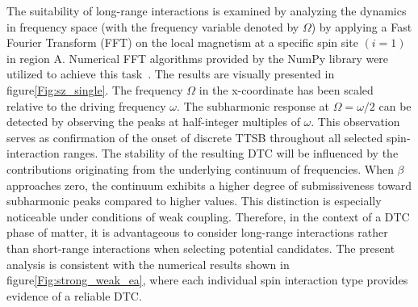 \documentclass[12pt]{iopart}
\begin{document}
The suitability of long-range interactions is examined by analyzing the dynamics in frequency space (with the frequency variable denoted by $\Omega$) by applying a Fast Fourier Transform (FFT) on the local magnetism at a specific spin site $(i=1)$ in region A. Numerical FFT algorithms provided by the NumPy library were utilized to achieve this task~\cite{harris2020array}. The results are visually presented in figure\ref{Fig:sz_single}.  The frequency $\Omega$ in the x-coordinate has been scaled relative to the driving frequency $\omega$. The subharmonic response at $\Omega=\omega/2$ can be detected by observing the peaks at half-integer multiples of $\omega$. This observation serves as confirmation of the onset of discrete TTSB throughout all selected spin-interaction ranges. The stability of the resulting DTC will be influenced by the contributions originating from the underlying continuum of frequencies. When $\beta$ approaches zero, the continuum exhibits a higher degree of submissiveness toward subharmonic peaks compared to higher values. This distinction is especially noticeable under conditions of weak coupling. Therefore, in the context of a DTC phase of matter, it is advantageous to consider long-range interactions rather than short-range interactions when selecting potential candidates. The present analysis is consistent with the numerical results shown in figure\ref{Fig:strong_weak_ea}, where each individual spin interaction type provides evidence of a reliable DTC.
\end{document}
